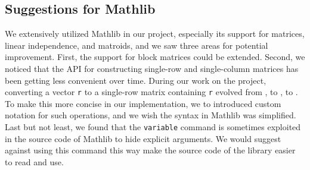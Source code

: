 \subsection{Suggestions for Mathlib}

We extensively utilized Mathlib in our project, especially its support for matrices, linear independence, and matroids, and we saw three areas for potential improvement. First, the support for block matrices could be extended. Second, we noticed that the API for constructing single-row and single-column matrices has been getting less convenient over time. During our work on the project, converting a vector \texttt{r} to a single-row matrix containing \texttt{r} evolved from , to , to . To make this more concise in our implementation, we to introduced custom notation for such operations, and we wish the syntax in Mathlib was simplified. Last but not least, we found that the \texttt{variable} command is sometimes exploited in the source code of Mathlib to hide explicit arguments. We would suggest against using this command this way make the source code of the library easier to read and use.